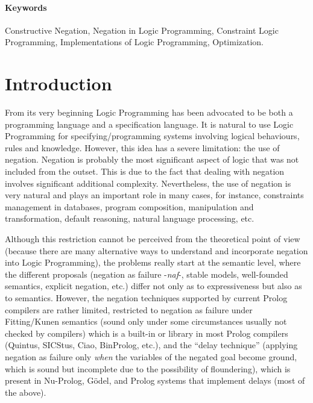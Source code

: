 \documentclass{llncs}
\newcommand{\naf}{{\em naf}}\newcommand{\viejo}[1]{}
\begin{document}
\paragraph{\bf Keywords}
Constructive Negation, Negation in Logic Programming, Constraint Logic
Programming, Implementations of Logic Programming, Optimization.



\section{Introduction}
\label{introduction}
From its very beginning Logic Programming has been advocated to be
both a programming language and a specification language. It is
natural to use Logic Programming for specifying/programming systems
involving logical behaviours, rules and knowledge. However, this idea
has a severe limitation: the use of negation. Negation is probably the
most significant aspect of logic that was not included from the
outset. This is due to the fact that dealing with negation involves
significant additional complexity. Nevertheless, the use of negation
is very natural and plays an important role in many cases, for
instance, constraints management in databases, program composition,
manipulation and transformation, default reasoning, natural language
processing, etc.

Although this restriction cannot be perceived from the theoretical point of
view (because there are many alternative ways to understand and
incorporate negation into Logic Programming), the problems really start
at the semantic level, where the different proposals (negation as
failure -\naf-, stable models, well-founded semantics, explicit
negation, etc.)  differ not only as to expressiveness but also as to
semantics.  However, the negation techniques supported by current
Prolog compilers are rather limited, restricted to negation as failure
under Fitting/Kunen semantics \cite{Kunen} (sound only under some
circumstances usually not checked by compilers) which is a built-in or
library in most Prolog compilers (Quintus, SICStus, Ciao, BinProlog,
etc.), and the ``delay technique'' (applying negation as failure only
\emph{when} the variables of the negated goal become ground, which is
sound but incomplete due to the possibility of floundering), which is
present in Nu-Prolog, G\"odel, and Prolog systems that implement
delays (most of the above).
\end{document}
